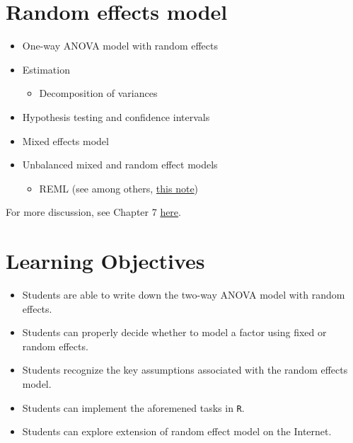 \documentclass[12pt,]{book}
\providecommand{\tightlist}{%
  \setlength{\itemsep}{0pt}\setlength{\parskip}{0pt}}
\begin{document}
\section{Random effects model}\label{random-effects-model}

\begin{itemize}
\tightlist
\item
  One-way ANOVA model with random effects
\item
  Estimation

  \begin{itemize}
  \tightlist
  \item
    Decomposition of variances
  \end{itemize}
\item
  Hypothesis testing and confidence intervals
\item
  Mixed effects model
\item
  Unbalanced mixed and random effect models

  \begin{itemize}
  \tightlist
  \item
    REML (see among others,
    \href{http://www2.compute.dtu.dk/courses/02429/enotepdfs/eNote-10.pdf}{this
    note})
  \end{itemize}
\end{itemize}

For more discussion, see Chapter 7
\href{https://stat.ethz.ch/~meier/teaching/anova/random-and-mixed-effects-models.html}{here}.

\section{Learning Objectives}\label{learning-objectives-3}

\begin{itemize}
\tightlist
\item
  Students are able to write down the two-way ANOVA model with random
  effects.
\item
  Students can properly decide whether to model a factor using fixed or
  random effects.
\item
  Students recognize the key assumptions associated with the random
  effects model.
\item
  Students can implement the aforemened tasks in \texttt{R}.
\item
  Students can explore extension of random effect model on the Internet.
\end{itemize}
\end{document}

